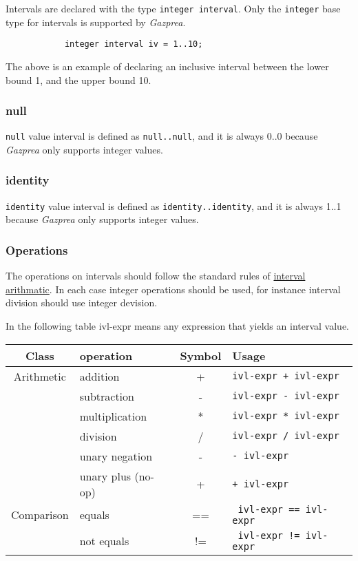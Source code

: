 \documentclass[../../gazprea.tex]{subfiles}
\begin{document}
		Intervals are declared with the type \texttt{integer interval}. Only the \texttt{integer} base type for
		intervals is supported by \textit{Gazprea}.

		\begin{lstlisting}
			integer interval iv = 1..10;
		\end{lstlisting}

		The above is an example of declaring an inclusive interval between the lower bound 1, and the upper bound 10.

	\subsubsection{null}

		\texttt{null} value interval is defined as \texttt{null..null}, and it is always 0..0 because \textit{Gazprea}
		only supports integer values.

	\subsubsection{identity}

		\texttt{identity} value interval is defined as \texttt{identity..identity}, and it is always 1..1 because
		\textit{Gazprea} only supports integer values.

	\subsubsection{Operations}

		The operations on intervals should follow the standard rules of
		\href{http://en.wikipedia.org/wiki/Interval_arithmetic}{interval arithmatic}. In each case integer operations
		should be used, for instance interval division should use integer devision.

		In the following table ivl-expr means any expression that yields an interval value.

		\begin{center}
			\begin{tabular}{|c|l|c|l|}
				\hline
				\textbf{Class} & \textbf{operation} & \textbf{Symbol} & \textbf{Usage} \\
				\hline
				Arithmetic & addition           & + & \texttt{ivl-expr + ivl-expr}  \\
				           & subtraction        & - &  \texttt{ivl-expr - ivl-expr}	\\
				           & multiplication     & * & \texttt{ivl-expr * ivl-expr}	\\
				           & division           & / & \texttt{ivl-expr / ivl-expr}	\\
				           & unary negation     & - & \texttt{- ivl-expr}	          \\
				           & unary plus (no-op) & + & \texttt{+ ivl-expr}           \\
				\hline
				Comparison & equals     & == & \texttt{ ivl-expr == ivl-expr} \\
				           & not equals & != & \texttt{ ivl-expr != ivl-expr} \\
				\hline
			\end{tabular}
		\end{center}
\end{document}
